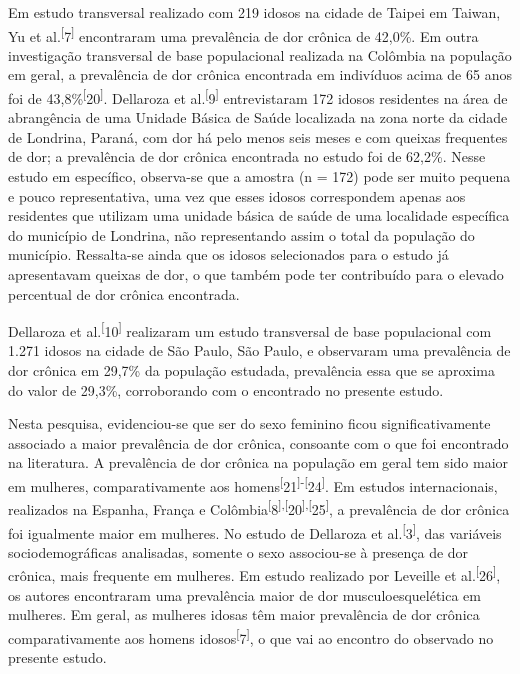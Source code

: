 \documentclass{article}
\begin{document}
Em estudo transversal realizado com 219 idosos na cidade de Taipei em Taiwan, Yu
et al.\textsuperscript{[}7\textsuperscript{]}
encontraram uma prevalência de dor crônica de 42,0\%. Em outra investigação
transversal de base populacional realizada na Colômbia na população em geral, a
prevalência de dor crônica encontrada em indivíduos acima de 65 anos foi de
43,8\%\textsuperscript{[}20\textsuperscript{]}. Dellaroza et al.\textsuperscript{[}9\textsuperscript{]}
entrevistaram 172 idosos residentes na área de abrangência de uma Unidade Básica
de Saúde localizada na zona norte da cidade de Londrina, Paraná, com dor há pelo
menos seis meses e com queixas frequentes de dor; a prevalência de dor crônica
encontrada no estudo foi de 62,2\%. Nesse estudo em específico, observa-se que a
amostra (n = 172) pode ser muito pequena e pouco representativa, uma vez que
esses idosos correspondem apenas aos residentes que utilizam uma unidade básica
de saúde de uma localidade específica do município de Londrina, não
representando assim o total da população do município. Ressalta-se ainda que os
idosos selecionados para o estudo já apresentavam queixas de dor, o que também
pode ter contribuído para o elevado percentual de dor crônica encontrada.

Dellaroza et al.\textsuperscript{[}10\textsuperscript{]}
realizaram um estudo transversal de base populacional com 1.271 idosos na cidade
de São Paulo, São Paulo, e observaram uma prevalência de dor crônica em 29,7\%
da população estudada, prevalência essa que se aproxima do valor de 29,3\%,
corroborando com o encontrado no presente estudo.

Nesta pesquisa, evidenciou-se que ser do sexo feminino ficou significativamente
associado a maior prevalência de dor crônica, consoante com o que foi encontrado
na literatura. A prevalência de dor crônica na população em geral tem sido maior
em mulheres, comparativamente aos homens\textsuperscript{[}21\textsuperscript{]}\textsuperscript{-}\textsuperscript{[}24\textsuperscript{]}. Em estudos internacionais, realizados na Espanha, França e
Colômbia\textsuperscript{[}8\textsuperscript{]}\textsuperscript{,}\textsuperscript{[}20\textsuperscript{]}\textsuperscript{,}\textsuperscript{[}25\textsuperscript{]}, a prevalência de dor crônica foi igualmente maior em mulheres. No estudo de
Dellaroza et al.\textsuperscript{[}3\textsuperscript{]}, das variáveis sociodemográficas analisadas, somente o sexo associou-se à
presença de dor crônica, mais frequente em mulheres. Em estudo realizado por
Leveille et al.\textsuperscript{[}26\textsuperscript{]}, os autores encontraram uma prevalência maior de dor musculoesquelética em
mulheres. Em geral, as mulheres idosas têm maior prevalência de dor crônica
comparativamente aos homens idosos\textsuperscript{[}7\textsuperscript{]}, o que vai ao encontro do observado no presente estudo.
\end{document}
